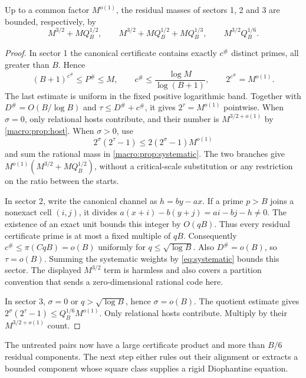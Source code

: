 \begin{proposition}\label{prop:shallow-final}
Up to a common factor $M^{o(1)}$, the residual masses of sectors 1, 2 and 3
are bounded, respectively, by
\[
 M^{3/2}+MQ_B^{1/2},\qquad
 M^{3/2}+MQ_B^{1/2}+MQ_B^{1/3},\qquad
 M^{3/2}Q_B^{1/6}.
\]
\end{proposition}
\begin{proof}
In sector 1 the canonical certificate contains exactly $c^\#$ distinct
primes, all greater than $B$. Hence
\begin{equation}\label{eq:growing-moment} 
 (B+1)^{c^\#}\le P^\#\le M,\qquad
 c^\#\le\frac{\log M}{\log(B+1)},\qquad 2^{c^\#}=M^{o(1)}.
\end{equation}
The last estimate is uniform in the fixed positive logarithmic band.
Together with $D^\#=O(B/\log B)$ and
$\tau\le D^\#+c^\#$, it gives $2^\tau=M^{o(1)}$ pointwise.
When $\sigma=0$, only relational hosts contribute, and their number is
$M^{3/2+o(1)}$ by \cref{macro:prop:host}. When $\sigma>0$, use
\[
 2^\sigma(2^\tau-1)
 \le2(2^\sigma-1)M^{o(1)}
\]
and sum the rational mass in \cref{macro:prop:systematic}.
The two branches give
$M^{o(1)}(M^{3/2}+MQ_B^{1/2})$, without a critical-scale substitution
or any restriction on the ratio between the starts.

In sector 2, write the canonical channel as $h=by-ax$.
If a prime $p>B$ joins a nonexact cell $(i,j)$, it divides
$a(x+i)-b(y+j)=ai-bj-h\ne0$. The existence of an exact unit bounds
this integer by $O(qB)$. Thus every residual certificate prime is at
most a fixed multiple of $qB$.
Consequently $c^\#\le\pi(CqB)=o(B)$ uniformly for
$q\le\sqrt{\log B}$. Also $D^\#=o(B)$, so $\tau=o(B)$.
Summing the systematic weights by \eqref{eq:systematic} bounds this
sector. The displayed $M^{3/2}$ term is harmless and also covers a
partition convention that sends a zero-dimensional rational code here.

In sector 3, $\sigma=0$ or $q>\sqrt{\log B}$, hence $\sigma=o(B)$.
The quotient estimate gives
$2^\sigma(2^\tau-1)\le Q_B^{1/6}M^{o(1)}$.
Only relational hosts contribute. Multiply by their $M^{3/2+o(1)}$ count.
\end{proof}

The untreated pairs now have a large certificate product and more than
$B/6$ residual components. The next step either rules out their alignment
or extracts a bounded component whose square class supplies a rigid
Diophantine equation.

